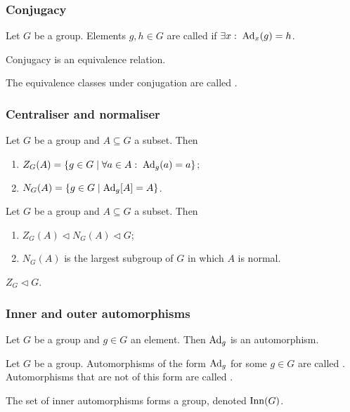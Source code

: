 \subsubsection{Conjugacy}
\begin{definition}
Let $G$ be a group. Elements $g,h\in G$ are called  if $\exists x: \; \operatorname{Ad}_x(g) = h$.
\end{definition}

\begin{proposition}
Conjugacy is an equivalence relation.
\end{proposition}
The equivalence classes under conjugation are called .


\subsubsection{Centraliser and normaliser}

\begin{lemma}
Let $G$ be a group and $A\subseteq G$ a subset. Then
\begin{enumerate}
\item $Z_G(A) = \setbuilder{g\in G}{\forall a\in A:\;\Ad_g(a) = a}$;
\item $N_G(A) = \setbuilder{g\in G}{\Ad_g[A] = A}$.
\end{enumerate}
\end{lemma}

\begin{proposition}
Let $G$ be a group and $A\subseteq G$ a subset. Then
\begin{enumerate}
\item $Z_G(A) \lhd N_G(A) \lhd G$;
\item $N_G(A)$ is the largest subgroup of $G$ in which $A$ is normal.
\end{enumerate}
\end{proposition}
\begin{corollary}
$Z_G\lhd G$.
\end{corollary}


\subsubsection{Inner and outer automorphisms}
\begin{lemma}
Let $G$ be a group and $g\in G$ an element. Then $\operatorname{Ad}_g$ is an automorphism.
\end{lemma}
\begin{definition}
Let $G$ be a group.
Automorphisms of the form $\operatorname{Ad}_g$ for some $g\in G$ are called . Automorphisms that are not of this form are called .

The set of inner automorphisms forms a group, denoted $\operatorname{Inn}(G)$.
\end{definition}

